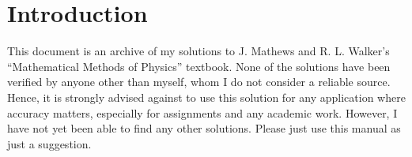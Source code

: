 \section{Introduction}

This document is an archive of my solutions to J. Mathews and R. L. Walker's ``Mathematical Methods of Physics'' textbook.
None of the solutions have been verified by anyone other than myself, whom I do not consider a reliable source.
Hence, it is strongly advised against to use this solution for any application where accuracy matters,
especially for assignments and any academic work.
However, I have not yet been able to find any other solutions.
Please just use this manual as just a suggestion.